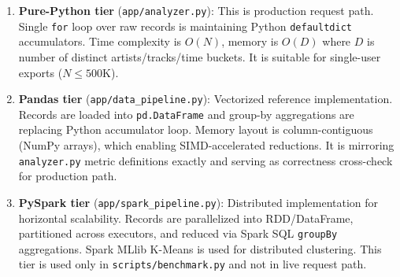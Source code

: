\documentclass[conference]{IEEEtran}
\begin{document}
\begin{enumerate}
  \item \textbf{Pure-Python tier} (\texttt{app/analyzer.py}): This is
        production request path. Single \texttt{for} loop over raw records
        is maintaining Python \texttt{defaultdict} accumulators. Time
        complexity is $O(N)$, memory is $O(D)$ where $D$ is number of distinct
        artists/tracks/time buckets. It is suitable for single-user exports
        ($N \leq 500\text{K}$).
  \item \textbf{Pandas tier} (\texttt{app/data\_pipeline.py}): Vectorized
        reference implementation. Records are loaded into \texttt{pd.DataFrame}
        and group-by aggregations are replacing Python accumulator loop. Memory
        layout is column-contiguous (NumPy arrays), which enabling
        SIMD-accelerated reductions. It is mirroring \texttt{analyzer.py}
        metric definitions exactly and serving as correctness cross-check
        for production path.
  \item \textbf{PySpark tier} (\texttt{app/spark\_pipeline.py}): Distributed
        implementation for horizontal scalability. Records are parallelized into
        RDD/DataFrame, partitioned across executors, and reduced via
        Spark SQL \texttt{groupBy} aggregations. Spark MLlib K-Means is used for
        distributed clustering. This tier is used only in \texttt{scripts/benchmark.py}
        and not in live request path.
\end{enumerate}
\end{document}

